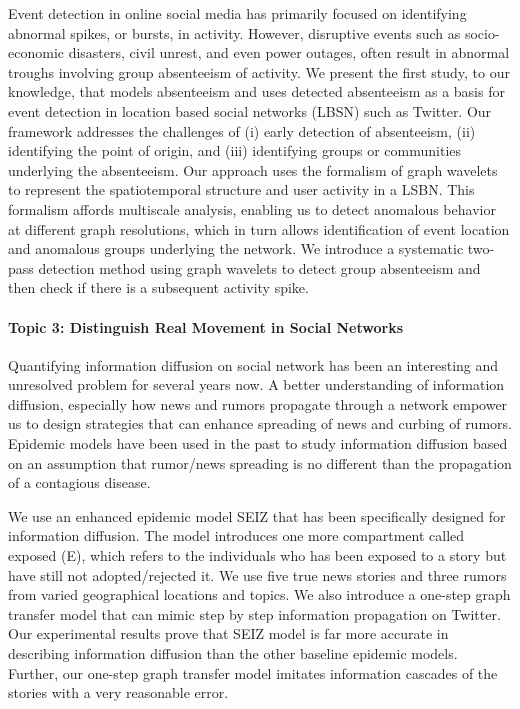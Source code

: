 Event detection in online social media has primarily focused on identifying
abnormal spikes, or bursts, in activity. However, disruptive events such as socio-economic disasters, civil unrest, and even power outages, often result in abnormal troughs involving group absenteeism of activity. We present the first study, to our knowledge, that models absenteeism and uses detected absenteeism as a basis for event detection in location based social networks (LBSN) such as Twitter. Our framework addresses the challenges of (i) early detection of absenteeism, (ii) identifying the point of origin, and (iii) identifying groups or communities underlying the absenteeism. Our approach uses the formalism of graph wavelets to represent the spatiotemporal structure and user activity in a LSBN. This formalism affords multiscale analysis, enabling us to detect anomalous behavior at different graph resolutions, which in turn allows identification of event location and anomalous groups underlying the network. We introduce a systematic two-pass detection method using graph wavelets to detect group absenteeism and then check if there is a subsequent activity spike.

\paragraph{Topic 3: Distinguish Real Movement in Social Networks}

Quantifying information diffusion on social network has been an interesting and unresolved problem for several years now. A better understanding of information diffusion, especially how news and rumors propagate through a network empower us to design strategies that can enhance spreading of news and curbing of rumors. Epidemic models have been used in the past to study information diffusion based on an assumption that rumor/news spreading is no different than the propagation of a contagious disease.

We use an enhanced epidemic model SEIZ that has been specifically designed for information diffusion. The model introduces one more compartment called exposed (E), which refers to the individuals who has been exposed to a story but have still not adopted/rejected it. We use five true news stories and three rumors from varied geographical locations and topics. We also introduce a one-step graph transfer model that can mimic step by step information propagation on Twitter. Our experimental results prove that SEIZ model is far more accurate in describing information diffusion than the other baseline epidemic models. Further, our one-step graph transfer model imitates information cascades of the stories with a very reasonable error.

